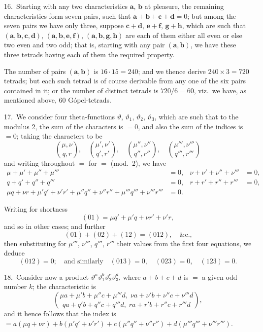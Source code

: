 \documentclass[11pt,a4paper]{article}
\theoremstyle{definition}
\begin{document}
16.\ Starting with any two characteristics $\mathbf{a}$, $\mathbf{b}$ at pleasure, the remaining characteristics form seven pairs, such that $\mathbf{a} + \mathbf{b} + \mathbf{c} + \mathbf{d} = 0$; but among the seven pairs we have only three, suppose $\mathbf{c} + \mathbf{d}$, $\mathbf{e} + \mathbf{f}$, $\mathbf{g} + \mathbf{h}$, which are such that $(\mathbf{a}, \mathbf{b}, \mathbf{c}, \mathbf{d})$, $(\mathbf{a}, \mathbf{b}, \mathbf{e}, \mathbf{f})$, $(\mathbf{a}, \mathbf{b}, \mathbf{g}, \mathbf{h})$ are each of them either all even or else two even and two odd; that is, starting with any pair $(\mathbf{a}, \mathbf{b})$, we have these three tetrads having each of them the required property.

The number of pairs $(\mathbf{a}, \mathbf{b})$ is $16 \cdot 15 = 240$; and we thence derive $240 \times 3 = 720$ tetrads; but each such tetrad is of course derivable from any one of the six pairs contained in it; or the number of distinct tetrads is $720/6 = 60$, viz.\ we have, as mentioned above, 60 G\'{o}pel-tetrads.

\medskip

17.\ We consider four theta-functions $\vartheta$, $\vartheta_1$, $\vartheta_2$, $\vartheta_3$, which are such that to the modulus 2, the sum of the characters is $= 0$, and also the sum of the indices is $= 0$; taking the characters to be
\[
\binom{\mu, \nu}{q, r}, \quad \binom{\mu', \nu'}{q', r'}, \quad \binom{\mu'', \nu''}{q'', r''}, \quad \binom{\mu''', \nu'''}{q''', r'''}
\]
and writing throughout $=$ for $=$ (mod.~2), we have
\begin{align*}
\mu + \mu' + \mu'' + \mu''' &= 0, & \nu + \nu' + \nu'' + \nu''' &= 0,\\
q + q' + q'' + q''' &= 0, & r + r' + r'' + r''' &= 0,\\
\mu q + \nu r + \mu' q' + \nu' r' + \mu'' q'' + \nu'' r'' + \mu''' q''' + \nu''' r''' &= 0.
\end{align*}

Writing for shortness
\[
(01) = \mu q' + \mu' q + \nu r' + \nu' r,
\]
and so in other cases; and further
\[
(01) + (02) + (12) = (012), \quad \text{\&c.,}
\]
then substituting for $\mu'''$, $\nu'''$, $q'''$, $r'''$ their values from the first four equations, we deduce
\[
(012) = 0; \quad \text{and similarly} \quad (013) = 0, \quad (023) = 0, \quad (123) = 0.
\]

\medskip

18.\ Consider now a product $\vartheta^a\vartheta_1^b\vartheta_2^c\vartheta_3^d$, where $a + b + c + d$ is $=$ a given odd number $k$; the characteristic is
\[
\binom{\mu a + \mu' b + \mu'' c + \mu''' d,\; \nu a + \nu' b + \nu'' c + \nu''' d}{qa + q'b + q''c + q'''d,\; ra + r'b + r''c + r'''d},
\]
and it hence follows that the index is $= a(\mu q + \nu r) + b(\mu' q' + \nu' r') + c(\mu'' q'' + \nu'' r'') + d(\mu''' q''' + \nu''' r''')$.
\end{document}
